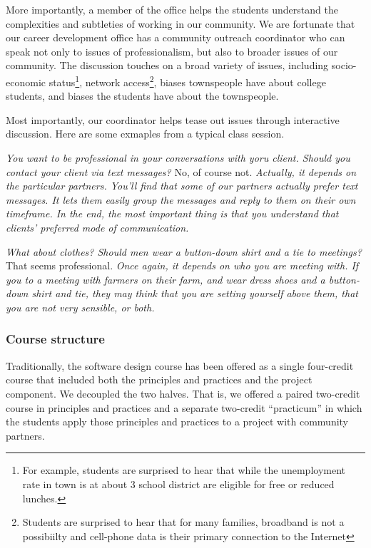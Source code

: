 More importantly, a member of the office helps the students understand
the complexities and subtleties of working in our community.  We
are fortunate that our career development office has a community
outreach coordinator who can speak not only to issues of professionalism,
but also to broader issues of our community.  The discussion touches
on a broad variety of issues, including socio-economic status\footnote{For
example, students are surprised to hear that while the unemployment
rate in town is at about 3%
school district are eligible for free or reduced lunches.}, network
access\footnote{Students are surprised to hear that for many families,
broadband is not a possibiilty and cell-phone data is their primary
connection to the Internet}, biases townspeople have about college
students, and biases the students have about the townspeople.

Most importantly, our coordinator helps tease out issues through interactive
discussion.  Here are some exmaples from a typical class session.

\newcommand{\question}[1]{\textsl{#1}}
\newcommand{\answer}[1]{#1}
\newcommand{\followup}[1]{\textsl{#1}}

\question{You want to be professional in your conversations with yoru client.  Should you contact your client via text messages?}
\answer{No, of course not.}
\followup{Actually, it depends on the particular partners.  You'll find that some of our partners actually prefer text messages.  It lets them easily group the messages and reply to them on their own timeframe.  In the end, the most important thing is that you understand that clients' preferred mode of communication.}

\question{What about clothes?  Should men wear a button-down shirt and a tie to meetings?}
\answer{That seems professional.}
\followup{Once again, it depends on who you are meeting with.  If you to a meeting with farmers on their farm, and wear dress shoes and a button-down shirt and tie, they may think that you are setting yourself above them, that you are not very sensible, or both.}


\subsubsection{Course structure}

Traditionally, the software design course has been offered as a single
four-credit course that included both the principles and practices and
the project component.  We decoupled the two halves.  That is, we 
offered a paired two-credit course in principles and practices and
a separate two-credit ``practicum'' in which the students apply
those principles and practices to a project with community partners.

